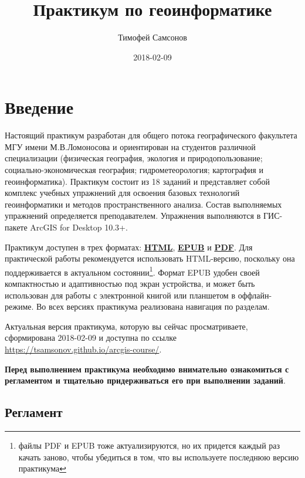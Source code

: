 \documentclass[]{book}
\title{Практикум по геоинформатике}
\author{Тимофей Самсонов}
\date{2018-02-09}
\let\rmarkdownfootnote\footnote%
\def\footnote{\protect\rmarkdownfootnote}
\theoremstyle{definition}
\theoremstyle{definition}
\theoremstyle{definition}
\theoremstyle{remark}
\begin{document}
\maketitle

{
\setcounter{tocdepth}{1}
\tableofcontents
}
\chapter*{Введение}

Настоящий практикум разработан для общего потока географического
факультета МГУ имени М.В.Ломоносова и ориентирован на студентов
различной специализации (физическая география, экология и
природопользование; социально-экономическая география;
гидрометеорология; картография и геоинформатика). Практикум состоит из
18 заданий и представляет собой комплекс учебных упражнений для освоения
базовых технологий геоинформатики и методов пространственного анализа.
Состав выполняемых упражнений определяется преподавателем. Упражнения
выполняются в ГИС-пакете ArcGIS for Desktop 10.3+.

Практикум доступен в трех форматах:
\href{https://tsamsonov.github.io/arcgis-course/}{\textbf{HTML}},
\href{https://tsamsonov.github.io/arcgis-course/arcgis-course.epub}{\textbf{EPUB}}
и
\href{https://tsamsonov.github.io/arcgis-course/arcgis-course.pdf}{\textbf{PDF}}.
Для практической работы рекомендуется использовать HTML-версию,
поскольку она поддерживается в актуальном состоянии\footnote{файлы PDF и
  EPUB тоже актуализируются, но их придется каждый раз качать заново,
  чтобы убедиться в том, что вы используете последнюю версию практикума}.
Формат EPUB удобен своей компактностью и адаптивностью под экран
устройства, и может быть использован для работы с электронной книгой или
планшетом в оффлайн-режиме. Во всех версиях практикума реализована
навигация по разделам.

Актуальная версия практикума, которую вы сейчас просматриваете,
сформирована 2018-02-09 и доступна по ссылке
\url{https://tsamsonov.github.io/arcgis-course/}.

\textbf{Перед выполнением практикума необходимо внимательно ознакомиться
с регламентом и тщательно придерживаться его при выполнении заданий}.

\section*{Регламент}
\end{document}

